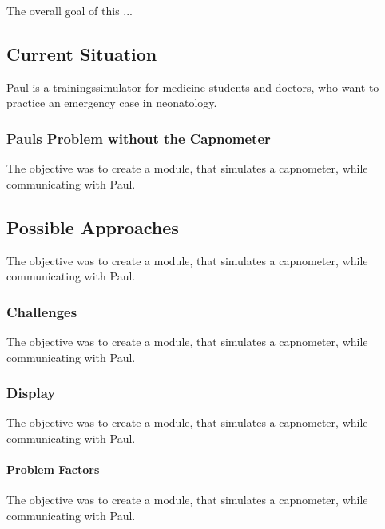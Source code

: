\documentclass[12pt]{article}
\begin{document}
The overall goal of this ...


\subsection{Current Situation}

Paul is a trainingssimulator for medicine students and doctors, who want to practice
an emergency case in neonatology.


\subsubsection{Pauls Problem without the Capnometer}

The objective was to create a module, that simulates a capnometer, while communicating
with Paul.


\subsection{Possible Approaches}

The objective was to create a module, that simulates a capnometer, while communicating
with Paul.


\subsubsection{Challenges}

The objective was to create a module, that simulates a capnometer, while communicating
with Paul.


\subsubsection{Display}

The objective was to create a module, that simulates a capnometer, while communicating
with Paul.


\paragraph{Problem Factors}

The objective was to create a module, that simulates a capnometer, while communicating
with Paul.


\clearpage

\end{document}
